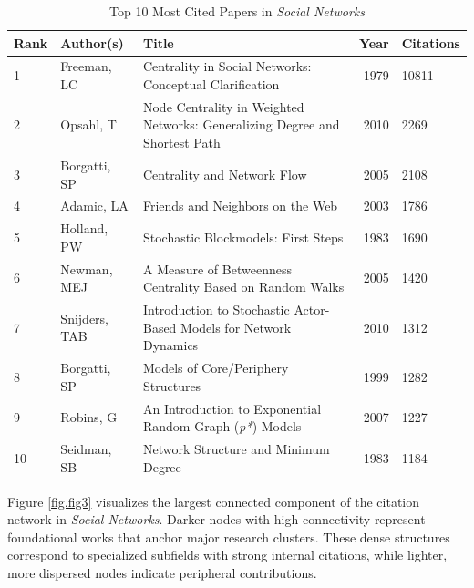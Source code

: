 \documentclass[twocolumn]{article}
\begin{document}
	\begin{table}[htbp]
		\centering
		\scriptsize
		\caption{Top 10 Most Cited Papers in \textit{Social Networks}}
		\label{table.tab4}
		\begin{tabularx}{\textwidth}{lXlrl}
			\toprule
			\textbf{Rank} & \textbf{Author(s)} & \textbf{Title} & \textbf{Year} & \textbf{Citations} \\
			\midrule
			1 & Freeman, LC & Centrality in Social Networks: Conceptual Clarification & 1979 & 10811 \\
			2 & Opsahl, T & Node Centrality in Weighted Networks: Generalizing Degree and Shortest Path & 2010 & 2269 \\
			3 & Borgatti, SP & Centrality and Network Flow & 2005 & 2108 \\
			4 & Adamic, LA & Friends and Neighbors on the Web & 2003 & 1786 \\
			5 & Holland, PW & Stochastic Blockmodels: First Steps & 1983 & 1690 \\
			6 & Newman, MEJ & A Measure of Betweenness Centrality Based on Random Walks & 2005 & 1420 \\
			7 & Snijders, TAB & Introduction to Stochastic Actor-Based Models for Network Dynamics & 2010 & 1312 \\
			8 & Borgatti, SP & Models of Core/Periphery Structures & 1999 & 1282 \\
			9 & Robins, G & An Introduction to Exponential Random Graph (\textit{p*}) Models & 2007 & 1227 \\
			10 & Seidman, SB & Network Structure and Minimum Degree & 1983 & 1184 \\
			\bottomrule
		\end{tabularx}
	\end{table}
	
	Figure \ref{fig.fig3} visualizes the largest connected component of the citation network in \textit{Social Networks}. Darker nodes with high connectivity represent foundational works that anchor major research clusters. These dense structures correspond to specialized subfields with strong internal citations, while lighter, more dispersed nodes indicate peripheral contributions.
	
\end{document}
